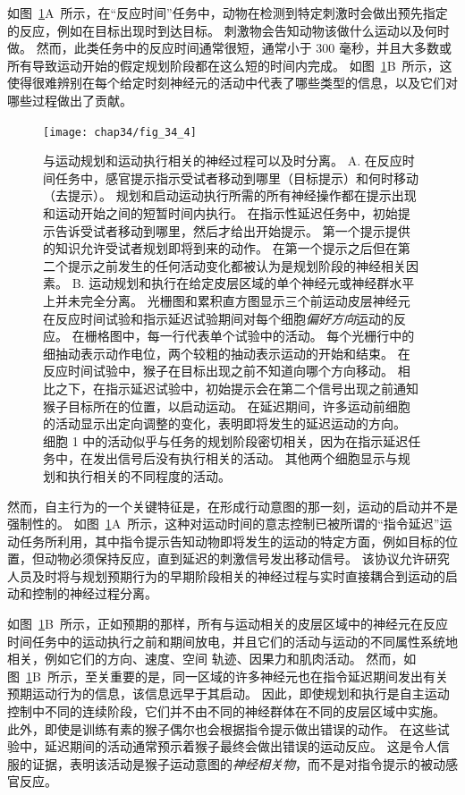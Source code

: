 如图~\ref{fig:34_4}A~所示，在“反应时间”任务中，动物在检测到特定刺激时会做出预先指定的反应，例如在目标出现时到达目标。
刺激物会告知动物该做什么运动以及何时做。
然而，此类任务中的反应时间通常很短，通常小于 300 毫秒，并且大多数或所有导致运动开始的假定规划阶段都在这么短的时间内完成。
如图~\ref{fig:34_4}B~所示，这使得很难辨别在每个给定时刻神经元的活动中代表了哪些类型的信息，以及它们对哪些过程做出了贡献。


\begin{figure}[htbp]
	\centering
	\texttt{[image: chap34/fig\_34\_4]}
	\caption{与运动规划和运动执行相关的神经过程可以及时分离\cite{crammond2000prior}。
		A. 在反应时间任务中，感官提示指示受试者移动到哪里（目标提示）和何时移动（去提示）。
		规划和启动运动执行所需的所有神经操作都在提示出现和运动开始之间的短暂时间内执行。
		在指示性延迟任务中，初始提示告诉受试者移动到哪里，然后才给出开始提示。
		第一个提示提供的知识允许受试者规划即将到来的动作。
		在第一个提示之后但在第二个提示之前发生的任何活动变化都被认为是规划阶段的神经相关因素。
		B. 运动规划和执行在给定皮层区域的单个神经元或神经群水平上并未完全分离。
		光栅图和累积直方图显示三个前运动皮层神经元在反应时间试验和指示延迟试验期间对每个细胞\textit{偏好方向}运动的反应。
		在栅格图中，每一行代表单个试验中的活动。
		每个光栅行中的细抽动表示动作电位，两个较粗的抽动表示运动的开始和结束。
		在反应时间试验中，猴子在目标出现之前不知道向哪个方向移动。
		相比之下，在指示延迟试验中，初始提示会在第二个信号出现之前通知猴子目标所在的位置，以启动运动。
		在延迟期间，许多运动前细胞的活动显示出定向调整的变化，表明即将发生的延迟运动的方向。
		细胞 1 中的活动似乎与任务的规划阶段密切相关，因为在指示延迟任务中，在发出信号后没有执行相关的活动。
		其他两个细胞显示与规划和执行相关的不同程度的活动。}
	\label{fig:34_4}
\end{figure}


然而，自主行为的一个关键特征是，在形成行动意图的那一刻，运动的启动并不是强制性的。
如图~\ref{fig:34_4}A~所示，这种对运动时间的意志控制已被所谓的“指令延迟”运动任务所利用，其中指令提示告知动物即将发生的运动的特定方面，例如目标的位置，但动物必须保持反应，直到延迟的刺激信号发出移动信号。
该协议允许研究人员及时将与规划预期行为的早期阶段相关的神经过程与实时直接耦合到运动的启动和控制的神经过程分离。


如图~\ref{fig:34_4}B~所示，正如预期的那样，所有与运动相关的皮层区域中的神经元在反应时间任务中的运动执行之前和期间放电，并且它们的活动与运动的不同属性系统地相关，例如它们的方向、速度、空间 轨迹、因果力和肌肉活动。
然而，如图~\ref{fig:34_4}B~所示，至关重要的是，同一区域的许多神经元也在指令延迟期间发出有关预期运动行为的信息，该信息远早于其启动。
因此，即使规划和执行是自主运动控制中不同的连续阶段，它们并不由不同的神经群体在不同的皮层区域中实施。
此外，即使是训练有素的猴子偶尔也会根据指令提示做出错误的动作。
在这些试验中，延迟期间的活动通常预示着猴子最终会做出错误的运动反应。
这是令人信服的证据，表明该活动是猴子运动意图的\textit{神经相关物}，而不是对指令提示的被动感官反应。



